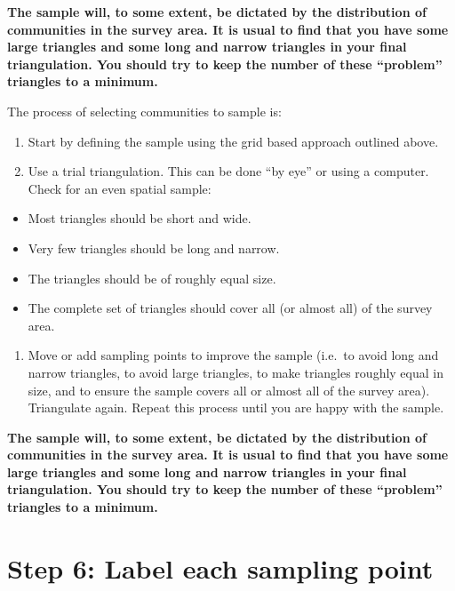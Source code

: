 \documentclass[12pt,a4paper]{book}
\providecommand{\tightlist}{%
  \setlength{\itemsep}{0pt}\setlength{\parskip}{0pt}}
\theoremstyle{definition}
\theoremstyle{definition}
\theoremstyle{definition}
\theoremstyle{remark}
\begin{document}
\textbf{The sample will, to some extent, be dictated by the distribution
of communities in the survey area. It is usual to find that you have
some large triangles and some long and narrow triangles in your final
triangulation. You should try to keep the number of these ``problem''
triangles to a minimum.}

The process of selecting communities to sample is:

\begin{enumerate}
\def\labelenumi{\arabic{enumi}.}
\item
  Start by defining the sample using the grid based approach outlined
  above.
\item
  Use a trial triangulation. This can be done ``by eye'' or using a
  computer. Check for an even spatial sample:
\end{enumerate}

\begin{itemize}
\item
  Most triangles should be short and wide.
\item
  Very few triangles should be long and narrow.
\item
  The triangles should be of roughly equal size.
\item
  The complete set of triangles should cover all (or almost all) of the
  survey area.
\end{itemize}

\begin{enumerate}
\def\labelenumi{\arabic{enumi}.}
\setcounter{enumi}{2}
\tightlist
\item
  Move or add sampling points to improve the sample (i.e.~to avoid long
  and narrow triangles, to avoid large triangles, to make triangles
  roughly equal in size, and to ensure the sample covers all or almost
  all of the survey area). Triangulate again. Repeat this process until
  you are happy with the sample.
\end{enumerate}

\textbf{The sample will, to some extent, be dictated by the distribution
of communities in the survey area. It is usual to find that you have
some large triangles and some long and narrow triangles in your final
triangulation. You should try to keep the number of these ``problem''
triangles to a minimum.}

\hypertarget{step-6-label-each-sampling-point}{%
\section{Step 6: Label each sampling
point}\label{step-6-label-each-sampling-point}}
\end{document}
